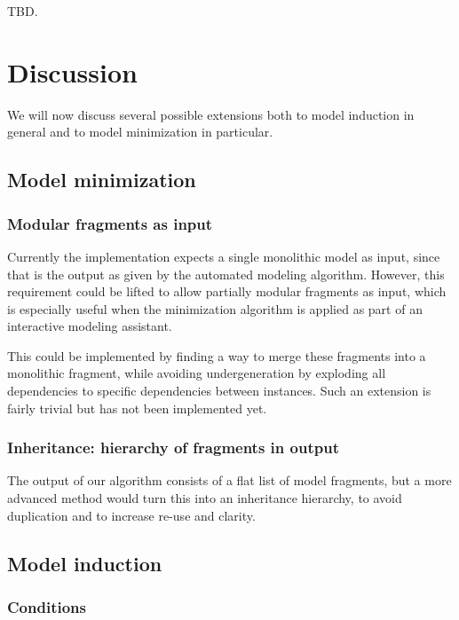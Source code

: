 \documentclass{article} %
\begin{document}
TBD.

\section{Discussion}
We will now discuss several possible extensions both to model induction in
general and to model minimization in particular.

\subsection{Model minimization}


\subsubsection{Modular fragments as input}

Currently the implementation expects a single monolithic model as input, since
that is the output as given by the automated modeling algorithm. However, this
requirement could be lifted to allow partially modular fragments as input,
which is especially useful when the minimization algorithm is applied as part
of an interactive modeling assistant.

This could be implemented by finding a way to merge these fragments into a
monolithic fragment, while avoiding undergeneration by exploding all
dependencies to specific dependencies between instances. Such an extension is
fairly trivial but has not been implemented yet.

\subsubsection{Inheritance: hierarchy of fragments in output}

The output of our algorithm consists of a flat list of model fragments, but a
more advanced method would turn this into an inheritance hierarchy, to avoid
duplication and to increase re-use and clarity.

\subsection{Model induction}

\subsubsection{Conditions}
\end{document}
